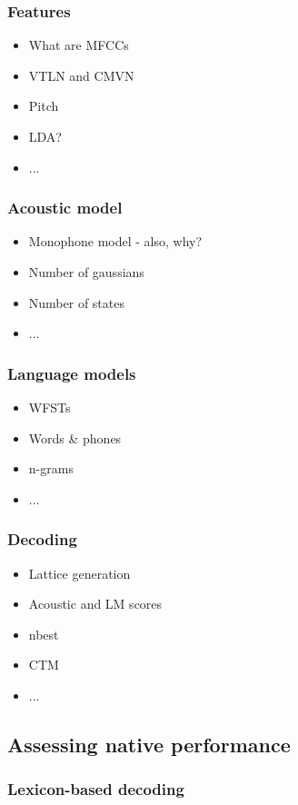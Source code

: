 \subsubsection{Features}
\begin{itemize}
\item What are MFCCs
\item VTLN and CMVN
\item Pitch
\item LDA?
\item ...
\end{itemize}

\subsubsection{Acoustic model}
\begin{itemize}
\item Monophone model - also, why?
\item Number of gaussians
\item Number of states
\item ...
\end{itemize}
    
\subsubsection{Language models}
\begin{itemize}
\item WFSTs
\item Words \& phones 
\item n-grams
\item ...
\end{itemize}

\subsubsection{Decoding}
\begin{itemize}
\item Lattice generation
\item Acoustic and LM scores 
\item nbest
\item CTM
\item ...
\end{itemize}

\subsection{Assessing native performance}
\subsubsection{Lexicon-based decoding}
